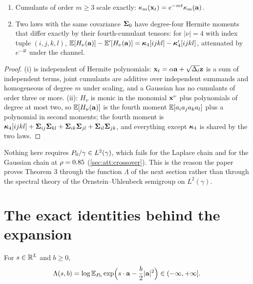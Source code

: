 \begin{corollary}
\label{cor:att:hermite}
\begin{enumerate}
\item Cumulants of order $m\ge3$ scale exactly: $\kappa_m(\mathbf{x}_t)=e^{-mt}\kappa_m(\mathbf{a})$.
\item Two laws with the same covariance $\mathbf{\Sigma}_0$ have degree-four Hermite moments that
differ exactly by their fourth-cumulant tensors: for $|\nu|=4$ with index tuple
$(i,j,k,l)$, $\mathbb{E}[H_\nu(\mathbf{a})]-\mathbb{E}'[H_\nu(\mathbf{a})]=\bm{\kappa}_4[ijkl]-\bm{\kappa}_4'[ijkl]$, attenuated by
$e^{-4t}$ under the channel.
\end{enumerate}
\end{corollary}

\begin{proof}
(i) is independent of Hermite polynomials: $\mathbf{x}_t=\alpha\mathbf{a}+\sqrt{\Delta_t}\mathbf{z}$ is a sum of
independent terms, joint cumulants are additive over independent summands and
homogeneous of degree $m$ under scaling, and a Gaussian has no cumulants of order
three or more. (ii): $H_\nu$ is monic in the monomial $\mathbf{x}^\nu$ plus polynomials of
degree at most two, so $\mathbb{E}[H_\nu(\mathbf{a})]$ is the fourth moment $\mathbb{E}[a_ia_ja_ka_l]$ plus a
polynomial in second moments; the fourth moment is $\bm{\kappa}_4[ijkl]+\mathbf{\Sigma}_{ij}\mathbf{\Sigma}_{kl}+\mathbf{\Sigma}_{ik}\mathbf{\Sigma}_{jl}+\mathbf{\Sigma}_{il}\mathbf{\Sigma}_{jk}$,
and everything except $\bm{\kappa}_4$ is shared by the two laws.
\end{proof}

Nothing here requires $P_0/\gamma\in L^2(\gamma)$, which fails for the Laplace chain
and for the Gaussian chain at $\rho=0.85$ (\cref{sec:att:crossover}). This is the
reason the paper proves Theorem 3 through the function $\Lambda$ of the next section
rather than through the spectral theory of the Ornstein--Uhlenbeck semigroup on
$L^2(\gamma)$.

\section{The exact identities behind the expansion}
\label{sec:att:identities}

\begin{definition}
\label{def:att:lambda}
For $s\in\mathbb{R}^{L}$ and $b\ge0$,
\begin{equation}
  \Lambda(s,b)=\log\mathbb{E}_{P_0}\exp\Bigl(s\cdot\mathbf{a}-\frac b2|\mathbf{a}|^2\Bigr)\in(-\infty,+\infty].
  \label{eq:att:lambda}
\end{equation}
\end{definition}

